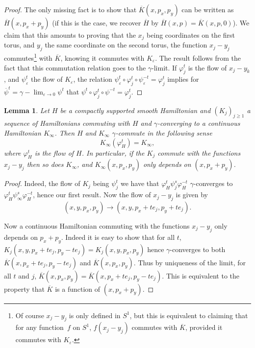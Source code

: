 \documentclass[JEP,XML,SOM,NoFloatCountersInSection,Unicode,published]{cedram}
\numberwithin{equation}{section}
\let \phi \varphi
\theoremstyle{plain}
\newtheorem{lemma}[theorem]{Lemma}
\theoremstyle{definition}
\theoremstyle{remark}
\begin{document}
\begin{proof}
The only missing fact is to show that $\overline K(x,p_x,p_y)$ can be written as $\overline H(x,p_x+p_y)$ (if this is the case, we recover
$\overline H$ by $\overline H(x,p)=\overline K(x,p,0)$). We claim that this amounts to proving that the $x_{j}$ being coordinates on the first torus, and $y_{j}$ the same coordinate on the second torus, the function $x_{j}-y_{j}$ commutes\footnote{Of course $x_{j}-y_{j}$ is only defined in $S^{1}$, but this is equivalent to claiming that for any function~$f$ on $S^{1}$, $f(x_{j}-y_{j})$ commutes with $\overline K$, provided it commutes
with $K_{\varepsilon}$.} with $\overline K$, knowing it commutes
with $K_{\varepsilon}$. The result follows from the fact that this commutation relation goes to the $\gamma$-limit. If $\varphi_{j}^{t}$ is the flow of $x_{j}-y_{k}$, and
$\psi_{ \varepsilon }^{t}$ the flow of $K_{ \varepsilon }$, the relation $\psi_{ \varepsilon }^{t}\circ \varphi_{j}^{t}\circ \psi_{ \varepsilon }^{-t}=\varphi_{j}^{t}$
implies for $\overline\psi^{t}=\gamma-\lim_{ \varepsilon \to 0}\psi^{t}$ that $\psi^{t}\circ \varphi_{j}^{t}\circ \psi^{-t}=\varphi_{j}^{t}$.
\end{proof}

\begin{lemma}
Let $H$ be a compactly supported smooth Hamiltonian and $(K_j)_{j\geq 1}$ a sequence of Hamiltonians commuting with $H$ and $\gamma$-converging to a continuous Hamiltonian $K_\infty$.
Then $H$ and $K_\infty$ $\gamma$-commute in the following sense
\[
K_\infty(\varphi_H^t)=K_\infty,
\]
where $\phi_H^t$ is the flow
of $H$. In particular, if the $K_j$ commute with the functions $x_j-y_j$ then so does $K_\infty$, and $K_\infty (x,p_x,p_y)$ only depends on
$(x,p_x+p_y)$.
\end{lemma}

\begin{proof}
Indeed, the flow of $K_j$ being $\psi_j^t$ we have that $ \varphi^t_H \psi_j^s \varphi^{-t}_H$ $\gamma$-converges to
$ \varphi^t_H \psi_\infty^s \varphi^{-t}_H$, hence our first result.
Now the flow of $x_j-y_j$ is given by
\[
(x,y,p_x,p_y) \to (x,y,p_x+te_j,p_y+te_j).
\]

Now a continuous Hamiltonian commuting with the functions $x_j-y_j$ only depends on $p_x+p_y$. Indeed it is easy to show that for all $t$,
$K_j(x,y,p_x+te_j,p_y-te_j)=K_j(x,y,p_x,p_y)$ hence $\gamma$-converges to both $\overline K(x,p_x+te_j,p_y-te_j)$ and $\overline K(x,p_x,p_y)$. Thus by uniqueness of the limit, for all $t$ and $j$,
$\overline K(x,p_x,p_y)=\overline K(x,p_x+te_j, p_y-te_j)$. This is equivalent to the property that $\overline K$ is a function of $(x,p_x+p_y)$.
\end{proof}
\end{document}
